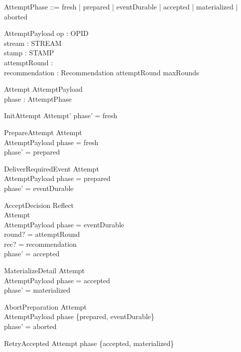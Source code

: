\documentclass[a4paper,10pt,fleqn]{article}
\begin{document}
\begin{zed}
\end{zed}
\begin{zed}
AttemptPhase ::= fresh | prepared | eventDurable | accepted
               | materialized | aborted
\end{zed}
\begin{schema}{AttemptPayload}
op : OPID \\
stream : STREAM \\
stamp : STAMP \\
attemptRound : \nat \\
recommendation : Recommendation
\where
attemptRound  \upto maxRounds
\end{schema}
\begin{schema}{Attempt}
AttemptPayload \\
phase : AttemptPhase
\end{schema}
\begin{schema}{InitAttempt}
Attempt'
\where
phase' = fresh
\end{schema}
\begin{schema}{PrepareAttempt}
\Delta Attempt \\
\Xi AttemptPayload
\where
phase = fresh \\
phase' = prepared
\end{schema}
\begin{schema}{DeliverRequiredEvent}
\Delta Attempt \\
\Xi AttemptPayload
\where
phase = prepared \\
phase' = eventDurable
\end{schema}
\begin{schema}{AcceptDecision}
Reflect \\
\Delta Attempt \\
\Xi AttemptPayload
\where
phase = eventDurable \\
round? = attemptRound \\
rec? = recommendation \\
phase' = accepted
\end{schema}
\begin{schema}{MaterializeDetail}
\Delta Attempt \\
\Xi AttemptPayload
\where
phase = accepted \\
phase' = materialized
\end{schema}
\begin{schema}{AbortPreparation}
\Delta Attempt \\
\Xi AttemptPayload
\where
phase \in \{prepared, eventDurable\} \\
phase' = aborted
\end{schema}
\begin{schema}{RetryAccepted}
\Xi Attempt
\where
phase \in \{accepted, materialized\}
\end{schema}
\end{document}
